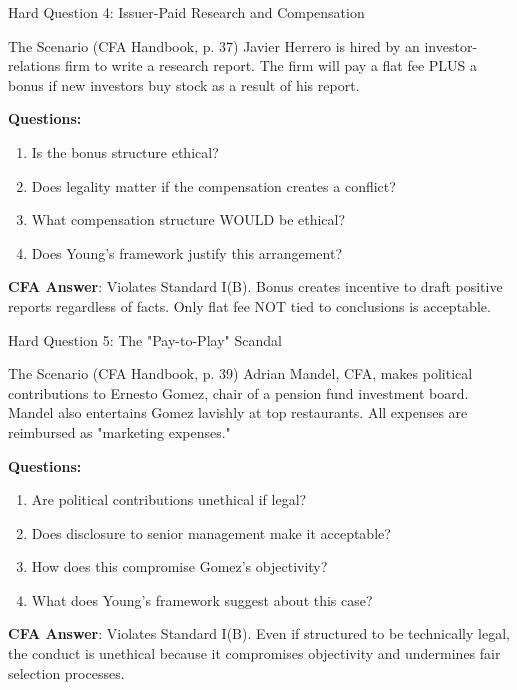 \documentclass{beamer}
\begin{document}
	\begin{frame}{Hard Question 4: Issuer-Paid Research and Compensation}
		\begin{block}{The Scenario (CFA Handbook, p. 37)}
			Javier Herrero is hired by an investor-relations firm to write a research report. The firm will pay a flat fee PLUS a bonus if new investors buy stock as a result of his report.
		\end{block}
		
		\vspace{0.2cm}
		\textbf{Questions:}
		\begin{enumerate}
			\item Is the bonus structure ethical?
			\item Does legality matter if the compensation creates a conflict?
			\item What compensation structure WOULD be ethical?
			\item Does Young's framework justify this arrangement?
		\end{enumerate}
		
		\vspace{0.2cm}
		\textcolor{cfablue}{\textbf{CFA Answer}}: Violates Standard I(B). Bonus creates incentive to draft positive reports regardless of facts. Only flat fee NOT tied to conclusions is acceptable.
	\end{frame}
	
	\begin{frame}{Hard Question 5: The "Pay-to-Play" Scandal}
		\begin{block}{The Scenario (CFA Handbook, p. 39)}
			Adrian Mandel, CFA, makes political contributions to Ernesto Gomez, chair of a pension fund investment board. Mandel also entertains Gomez lavishly at top restaurants. All expenses are reimbursed as "marketing expenses."
		\end{block}
		
		\vspace{0.2cm}
		\textbf{Questions:}
		\begin{enumerate}
			\item Are political contributions unethical if legal?
			\item Does disclosure to senior management make it acceptable?
			\item How does this compromise Gomez's objectivity?
			\item What does Young's framework suggest about this case?
		\end{enumerate}
		
		\vspace{0.2cm}
		\textcolor{cfablue}{\textbf{CFA Answer}}: Violates Standard I(B). Even if structured to be technically legal, the conduct is unethical because it compromises objectivity and undermines fair selection processes.
	\end{frame}
	
\end{document}
